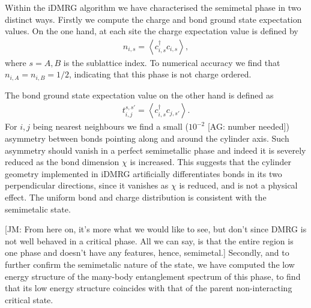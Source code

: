 \documentclass[aps,prx,10pt,twocolumn,floatfix,superscriptaddress,showpacs,numerical,footinbib]{revtex4-1}
\newcommand{\noteAG}[1]{{\color{blue} [AG: #1]}}
\newcommand{\noteJM}[1]{{\color{red} [JM: #1]}}
\begin{document}
%
Within the iDMRG algorithm we have characterised the semimetal phase in two distinct ways.
%
Firstly we compute the charge and bond ground state expectation values.
%
On the one hand, at each site the charge expectation value is defined by 
%
\begin{eqnarray}
\label{eq:charge}
n_{i,s}=\left\langle c^{\dagger}_{i,s}c_{i,s}\right\rangle,  
\end{eqnarray}
%
where $s=A,B$ is the sublattice index.
%
To numerical accuracy we find that $n_{i,A}=n_{i,B}=1/2$, indicating that this phase is not charge ordered.
%

The bond ground state expectation value on the other hand is defined as
%
\begin{eqnarray}
\label{eq:bond}
t^{s,s'}_{i,j}=\left\langle c^{\dagger}_{i,s}c_{j,s'}\right\rangle.
\end{eqnarray}
%
For $i,j$ being nearest neighbours we find a small ($10^{-2}$ \noteAG{number needed}) asymmetry
between bonds pointing along and around the cylinder axis.
%
Such asymmetry should vanish in a perfect semimetallic phase and indeed it is severely reduced as the bond dimension $\chi$ is increased.
% 
This suggests that the cylinder geometry implemented in iDMRG artificially differentiates bonds in its two perpendicular directions,
since it vanishes as $\chi$ is reduced, and is not a physical effect.
%
The uniform bond and charge distribution is consistent with the semimetalic state.

\noteJM{From here on, it's more what we would like to see, but don't since DMRG is not well behaved in a critical phase. All we can say, is that the entire region is one phase and doesn't have any features, hence, semimetal.}
%
Secondly, and to further confirm the semimetalic nature of the state, we have computed the low energy structure of the many-body 
entanglement spectrum of this phase, to find that its low energy structure coincides with that of the parent non-interacting critical state.\\

\end{document}

